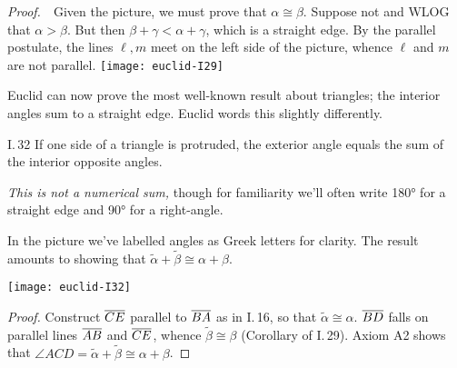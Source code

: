 \begin{tcolorbox}[proofstyle,lower separated=false, sidebyside, sidebyside align=top seam, sidebyside gap=0pt, righthand width=0.37\linewidth]
	\emph{Proof.}\ \ Given the picture, we must prove that $\alpha\cong\beta$.\smallbreak
	Suppose not and WLOG that $\alpha>\beta$.\smallbreak
	But then $\beta+\gamma<\alpha+\gamma$, which is a straight edge.\smallbreak
	By the parallel postulate, the lines $\ell,m$ meet on the left side of the picture, whence $\ell$ and $m$ are not parallel.
	\tcblower
	\flushright
	\texttt{[image: euclid-I29]}\\[-10pt]\qedsymbol
\end{tcolorbox}

Euclid can now prove the most well-known result about triangles; the interior angles sum to a straight edge. Euclid words this slightly differently.

\begin{thm}{I.\,32}{}
	If one side of a triangle is protruded, the exterior angle equals the sum of the interior opposite angles.
\end{thm}

\begin{minipage}[t]{0.62\linewidth}\vspace{-4pt}
	\emph{This is not a numerical sum,} though for familiarity we'll often write \ang{180} for a straight edge and \ang{90} for a right-angle.\par
	In the picture we've labelled angles as Greek letters for clarity. The result amounts to showing that $\widetilde\alpha+\widetilde\beta\cong\alpha+\beta$.
\end{minipage}
\hfill
\begin{minipage}[t]{0.37\linewidth}\vspace{-9pt}
	\flushright
	\texttt{[image: euclid-I32]}
\end{minipage}

\vspace{-20pt}

\begin{proof}
	Construct $\overline{CE}$ parallel to $\overline{BA}$ as in I.\,16, so that $\widetilde\alpha\cong\alpha$.\smallbreak
	$\overline{BD}$ falls on parallel lines $\overline{AB}$ and $\overline{CE}$, whence $\widetilde\beta\cong\beta$ (Corollary of I.\,29).\smallbreak
	Axiom A2 shows that $\angle ACD=\widetilde\alpha+\widetilde\beta\cong\alpha+\beta$.
\end{proof}


\label{pg:sphere}

